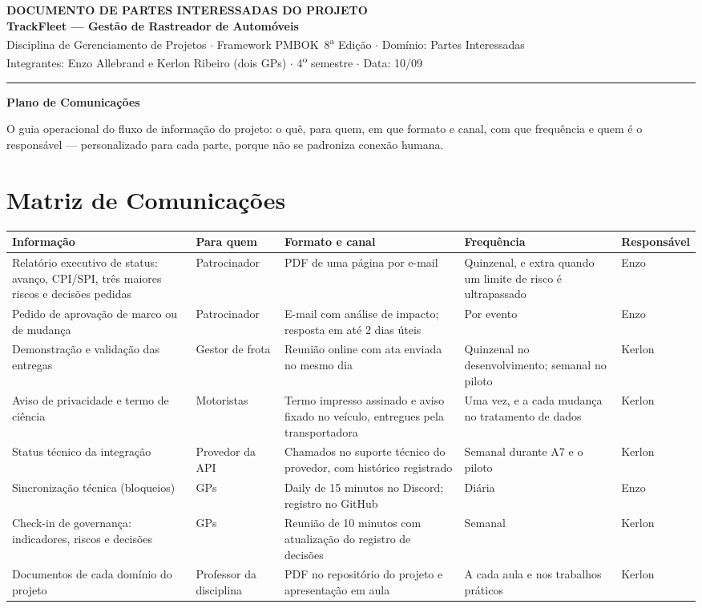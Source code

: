 \documentclass[11pt,a4paper]{article}
\newcommand{\cabecalho}[3]{%
  \begin{center}
  {\Large\bfseries DOCUMENTO DE #1 DO PROJETO}\\[2pt]
  {\large\bfseries TrackFleet --- Gestão de Rastreador de Automóveis}\\[4pt]
  Disciplina de Gerenciamento de Projetos $\cdot$ Framework PMBOK\textregistered\ 8\textsuperscript{a} Edição $\cdot$ Domínio: #2\\[2pt]
  Integrantes: Enzo Allebrand e Kerlon Ribeiro (dois GPs) $\cdot$ 4\textsuperscript{o} semestre $\cdot$ Data: #3
  \end{center}
  \vspace{2mm}\hrule\vspace{4mm}}
\newcommand{\parte}[1]{\noindent\textbf{\large #1}\par\vspace{1mm}}
\begin{document}
\cabecalho{PARTES INTERESSADAS}{Partes Interessadas}{10/09}

\parte{Plano de Comunicações}
\noindent O guia operacional do fluxo de informação do projeto: o quê, para quem, em que formato e canal, com que frequência e quem é o responsável --- personalizado para cada parte, porque não se padroniza conexão humana.

\section{Matriz de Comunicações}

\begin{center}
\small
\begin{tabularx}{\textwidth}{>{\raggedright\arraybackslash}p{3.3cm} >{\raggedright\arraybackslash}p{2.2cm} L >{\raggedright\arraybackslash}p{2.4cm} l}
\toprule
\textbf{Informação} & \textbf{Para quem} & \textbf{Formato e canal} & \textbf{Frequência} & \textbf{Responsável} \\
\midrule
Relatório executivo de status: avanço, CPI/SPI, três maiores riscos e decisões pedidas & Patrocinador & PDF de uma página por e-mail & Quinzenal, e extra quando um limite de risco é ultrapassado & Enzo \\
\addlinespace
Pedido de aprovação de marco ou de mudança & Patrocinador & E-mail com análise de impacto; resposta em até 2 dias úteis & Por evento & Enzo \\
\addlinespace
Demonstração e validação das entregas & Gestor de frota & Reunião online com ata enviada no mesmo dia & Quinzenal no desenvolvimento; semanal no piloto & Kerlon \\
\addlinespace
Aviso de privacidade e termo de ciência & Motoristas & Termo impresso assinado e aviso fixado no veículo, entregues pela transportadora & Uma vez, e a cada mudança no tratamento de dados & Kerlon \\
\addlinespace
Status técnico da integração & Provedor da API & Chamados no suporte técnico do provedor, com histórico registrado & Semanal durante A7 e o piloto & Kerlon \\
\addlinespace
Sincronização técnica (bloqueios) & GPs & Daily de 15 minutos no Discord; registro no GitHub & Diária & Enzo \\
\addlinespace
Check-in de governança: indicadores, riscos e decisões & GPs & Reunião de 10 minutos com atualização do registro de decisões & Semanal & Kerlon \\
\addlinespace
Documentos de cada domínio do projeto & Professor da disciplina & PDF no repositório do projeto e apresentação em aula & A cada aula e nos trabalhos práticos & Kerlon \\
\bottomrule
\end{tabularx}
\end{center}
\end{document}

